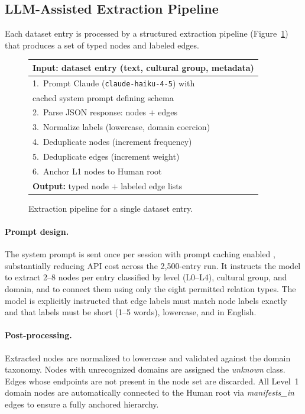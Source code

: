 \documentclass[11pt]{article}
\begin{document}
\subsection{LLM-Assisted Extraction Pipeline}
\label{sec:pipeline}

Each dataset entry is processed by a structured extraction pipeline
(Figure~\ref{fig:pipeline}) that produces a set of typed nodes and
labeled edges.

\begin{figure}[h]
\centering
\small
\begin{tabular}{l}
\toprule
\textbf{Input:} dataset entry (text, cultural group, metadata) \\
\midrule
1.\ Prompt Claude (\texttt{claude-haiku-4-5}) with \\
\quad cached system prompt defining schema \\
2.\ Parse JSON response: nodes $+$ edges \\
3.\ Normalize labels (lowercase, domain coercion) \\
4.\ Deduplicate nodes (increment frequency) \\
5.\ Deduplicate edges (increment weight) \\
6.\ Anchor L1 nodes to Human root \\
\midrule
\textbf{Output:} typed node $+$ labeled edge lists \\
\bottomrule
\end{tabular}
\caption{Extraction pipeline for a single dataset entry.}
\label{fig:pipeline}
\end{figure}

\paragraph{Prompt design.}
The system prompt is sent once per session with prompt caching enabled
\cite{anthropic2024caching}, substantially reducing API cost across the
2,500-entry run.
It instructs the model to extract 2–8 nodes per entry classified by
level (L0–L4), cultural group, and domain, and to connect them using only
the eight permitted relation types.
The model is explicitly instructed that edge labels must match node labels
exactly and that labels must be short (1–5 words), lowercase, and in
English.

\paragraph{Post-processing.}
Extracted nodes are normalized to lowercase and validated against the
domain taxonomy.
Nodes with unrecognized domains are assigned the \emph{unknown} class.
Edges whose endpoints are not present in the node set are discarded.
All Level~1 domain nodes are automatically connected to the Human root
via \emph{manifests\_in} edges to ensure a fully anchored hierarchy.
\end{document}
